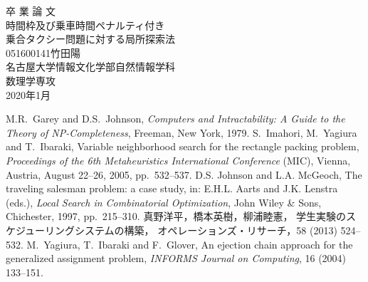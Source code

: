 \documentclass[uplatex]{ujreport}
\begin{document}
\begin{table}[b]
\begin{center}
{\huge 卒\hspace{0.1cm} 業\hspace{0.1cm} 論\hspace{0.1cm} 文}\\[2.5cm]
{\huge 時間枠及び乗車時間ペナルティ付き\\乗合タクシー問題に対する局所探索法}\\[6cm]
{\huge 051600141\qquad 竹田陽}\\[1cm]
{\huge 名古屋大学情報文化学部自然情報学科}\\[0.5cm]
{\huge 数理学専攻}\\[0.5cm]
{\huge 2020年1月}\\
\end{center}
\end{table}


\thispagestyle{empty}
\clearpage
\newpage
{}
\setcounter{page}{1}







\thispagestyle{empty}
\tableofcontents
\newpage
\setcounter{page}{1}
\pagestyle{plain}















\begin{thebibliography}{99}
  M.R.~Garey and D.S.~Johnson,
	 {\it Computers and Intractability: A Guide to the Theory of NP-Completeness},
	 Freeman, New York, 1979.
  S.~Imahori, M.~Yagiura and T.~Ibaraki,
	 Variable neighborhood search for the rectangle packing problem,
         {\it Proceedings of the 6th Metaheuristics International Conference} (MIC),
	 Vienna, Austria, August 22--26, 2005, pp.~532--537.
  D.S. Johnson and L.A. McGeoch,
	 The traveling salesman problem: a case study,
	 in: E.H.L. Aarts and J.K. Lenstra (eds.),
	 {\it Local Search in Combinatorial Optimization},
	 John Wiley \& Sons, Chichester, 1997, pp.~215--310.
  真野洋平，橋本英樹，柳浦睦憲，
	 学生実験のスケジューリングシステムの構築，
	 オペレーションズ・リサーチ，58 (2013) 524--532.
  M.~Yagiura, T.~Ibaraki and F.~Glover,
	 An ejection chain approach for the generalized assignment problem,
	 {\it INFORMS Journal on Computing}, 16 (2004) 133--151.
\end{thebibliography}
\end{document}
